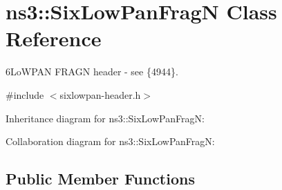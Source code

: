 \hypertarget{classns3_1_1SixLowPanFragN}{}\section{ns3\+:\+:Six\+Low\+Pan\+FragN Class Reference}
\label{classns3_1_1SixLowPanFragN}


6\+Lo\+W\+P\+AN F\+R\+A\+GN header -\/ see \{4944\}.  




{\ttfamily \#include $<$sixlowpan-\/header.\+h$>$}



Inheritance diagram for ns3\+:\+:Six\+Low\+Pan\+FragN\+:


Collaboration diagram for ns3\+:\+:Six\+Low\+Pan\+FragN\+:
\subsection*{Public Member Functions}
